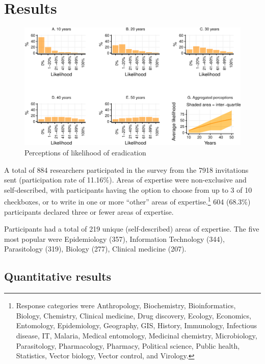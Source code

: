 \documentclass[]{article}
\let\rmarkdownfootnote\footnote%
\def\footnote{\protect\rmarkdownfootnote}
\begin{document}
\section{Results}\label{results}

\begin{figure}[h]

{\centering \includegraphics{paper_files/figure-latex/unnamed-chunk-4-1} 

}

\caption{Perceptions of likelihood of eradication}\label{fig:unnamed-chunk-4}
\end{figure}

A total of 884 researchers participated in the survey from the 7918
invitations sent (participation rate of 11.16\%). Areas of expertise
were non-exclusive and self-described, with participants having the
option to choose from up to 3 of 10 checkboxes, or to write in one or
more ``other'' areas of
expertise.\footnote{Response categories were Anthropology, Biochemistry, Bioinformatics, Biology, Chemistry, Clinical medicine, Drug discovery, Ecology, Economics, Entomology, Epidemiology, Geography, GIS, History, Immunology, Infectious disease, IT, Malaria, Medical entomology, Medicinal chemistry, Microbiology, Parasitology, Pharmacology, Pharmacy, Political science, Public health, Statistics, Vector biology, Vector control, and Virology.}
604 (68.3\%) participants declared three or fewer areas of expertise.

Participants had a total of 219 unique (self-described) areas of
expertise. The five most popular were Epidemiology (357), Information
Technology (344), Parasitology (319), Biology (277), Clinical medicine
(207).

\subsection*{Quantitative results}
\end{document}
